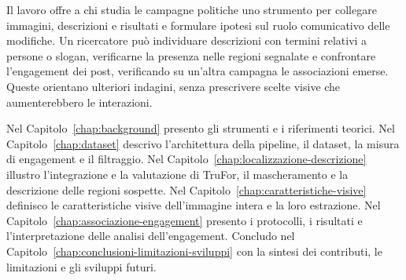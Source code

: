 Il lavoro offre a chi studia le campagne politiche uno strumento per collegare immagini, descrizioni e risultati e formulare ipotesi sul ruolo comunicativo delle modifiche. Un ricercatore può individuare descrizioni con termini relativi a persone o slogan, verificarne la presenza nelle regioni segnalate e confrontare l'engagement dei post, verificando su un'altra campagna le associazioni emerse. Queste orientano ulteriori indagini, senza prescrivere scelte visive che aumenterebbero le interazioni.

Nel Capitolo~\ref{chap:background} presento gli strumenti e i riferimenti teorici. Nel Capitolo~\ref{chap:dataset} descrivo l'architettura della pipeline, il dataset, la misura di engagement e il filtraggio. Nel Capitolo~\ref{chap:localizzazione-descrizione} illustro l'integrazione e la valutazione di TruFor, il mascheramento e la descrizione delle regioni sospette. Nel Capitolo~\ref{chap:caratteristiche-visive} definisco le caratteristiche visive dell'immagine intera e la loro estrazione. Nel Capitolo~\ref{chap:associazione-engagement} presento i protocolli, i risultati e l'interpretazione delle analisi dell'engagement. Concludo nel Capitolo~\ref{chap:conclusioni-limitazioni-sviluppi} con la sintesi dei contributi, le limitazioni e gli sviluppi futuri.
